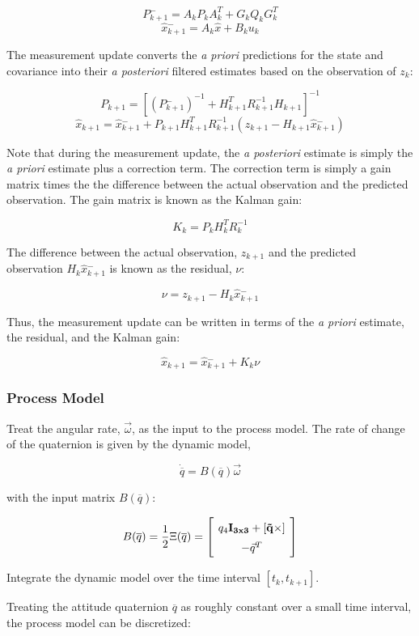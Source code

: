 \documentclass{article}
\newcommand{\mat}[2][ccccccccccccccccccccccccccccccccccccccccccccc]{\left[
        \arraycolsep=4pt\def\arraystretch{1.5}
        \begin{array}{#1} #2 \\ 
        \end{array} 
        \right]}
\begin{document}
\begin{flushleft}
$$ P{^{-}_{k+1}} = A_k P_k A_k^{T} + G_k Q_k G_k^{T} $$
$$ \hat{x}{^{-}_{k+1}} = A_k \hat{x} + B_k u_k $$

The measurement update converts the \textit{a priori} predictions for the state and covariance into their \textit{a posteriori} filtered estimates based on the observation of $z_k$: 

$$ P_{k+1} = [ (P{^{-}_{k+1}})^{-1} + H_{k+1}^{T} R_{k+1}^{-1} H_{k+1} ]^{-1} $$
$$ \hat{x}_{k+1} = \hat{x}{^{-}_{k+1}} + P_{k+1} H_{k+1}^{T} R_{k+1}^{-1} (z_{k+1} - H_{k+1} \hat{x}{^{-}_{k+1}}) $$

Note that during the measurement update, the \textit{a posteriori} estimate is simply the \textit{a priori} estimate plus a correction term. The correction term is simply a gain matrix times the the difference between the actual observation and the predicted observation. The gain matrix is known as the Kalman gain: 

$$ K_k = P_k H_k^{T} R_k^{-1} $$

The difference between the actual observation, $z_{k+1}$ and the predicted observation $H_k \hat{x}{^-_{k+1}}$ is known as the residual, $\nu$:

$$ \nu = z_{k+1} - H_k \hat{x}{^-_{k+1}} $$

Thus, the measurement update can be written in terms of the \textit{a priori} estimate, the residual, and the Kalman gain:

$$ \hat{x}_{k+1} = \hat{x}{^-_{k+1}} + K_k \nu $$

\subsubsection{Process Model}

Treat the angular rate, $\vec{\omega}$, as the input to the process model. The rate of change of the quaternion is given by the dynamic model, 

\[ \dot{\overline{q}} = B(\overline{q}) \vec{\omega} \]

with the input matrix $B(\overline{q})$: 

\[ B(\overline{q}) = \frac{1}{2} \Xi(\overline{q}) = \mat{q_4 \bf{I}_{3x3} + [\vec{q}\times] \\ -\vec{q}^T } \]

Integrate the dynamic model over the time interval $[t_k, t_{k+1}]$. 

Treating the attitude quaternion $\overline{q}$ as roughly constant over a small time interval, the process model can be discretized: 


\end{flushleft}
\end{document}
